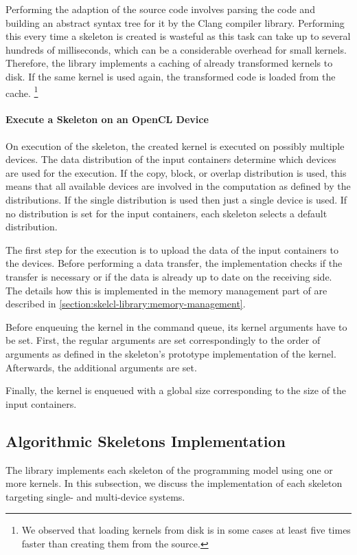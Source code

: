 Performing the adaption of the source code involves parsing the code and building an abstract syntax tree for it by the Clang compiler library.
Performing this every time a skeleton is created is wasteful as this task can take up to several hundreds of milliseconds, which can be a considerable overhead for small kernels.
Therefore, the \SkelCL library implements a caching of already transformed kernels to disk.
If the same kernel is used again, the transformed code is loaded from the cache.%
\footnote{We observed that loading kernels from disk is in some cases at least five times faster than creating them from the source.}


\paragraph{Execute a Skeleton on an OpenCL Device}
On execution of the skeleton, the created \OpenCL kernel is executed on possibly multiple \OpenCL devices.
The data distribution of the input containers determine which \OpenCL devices are used for the execution.
If the copy, block, or overlap distribution is used, this means that all available devices are involved in the computation as defined by the distributions.
If the single distribution is used then just a single device is used.
If no distribution is set for the input containers, each skeleton selects a default distribution.

The first step for the execution is to upload the data of the input containers to the \OpenCL devices.
Before performing a data transfer, the \SkelCL implementation checks if the transfer is necessary or if the data is already up to date on the receiving side.
The details how this is implemented in the memory management part of \SkelCL are described in \autoref{section:skelcl-library:memory-management}.

Before enqueuing the \OpenCL kernel in the \OpenCL command queue, its kernel arguments have to be set.
First, the regular arguments are set correspondingly to the order of arguments as defined in the skeleton's prototype implementation of the \OpenCL kernel.
Afterwards, the additional arguments are set.

Finally, the \OpenCL kernel is enqueued with a global size corresponding to the size of the input containers.










\subsection{Algorithmic Skeletons Implementation}
\label{section:skelcl-library:skeletons}
The \SkelCL library implements each skeleton of the \SkelCL programming model using one or more \OpenCL kernels.
In this subsection, we discuss the implementation of each skeleton targeting single- and multi-device systems.





